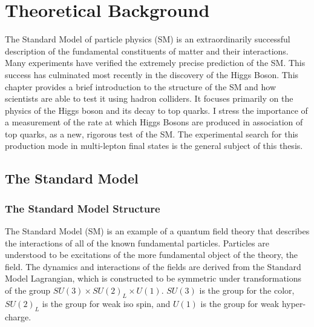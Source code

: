 \chapter[Theoretical Background][Theoretical Background]{Theoretical Background}

The Standard Model of particle physics (SM) is an extraordinarily successful
description of the fundamental constituents of matter and their interactions.
Many experiments have verified the extremely precise
prediction of the SM. This success has culminated most recently in the
discovery of the Higgs Boson.  This chapter provides a brief introduction to
the structure of the SM and how scientists are able to test it using hadron
colliders. It focuses primarily on the physics of the Higgs boson and its decay
to top quarks.  I stress the importance of a
measurement of the rate at which Higgs Bosons are produced in association of
top quarks, as a new, rigorous test of the SM. The experimental search
for this production mode in multi-lepton final states is the 
general subject of this thesis.


\section{The Standard Model}
\subsection{The Standard Model Structure}

The Standard Model (SM) \cite{np_22_579, prl_19_1264, 1964.Salam-Ward.gauge-theory,1973.Weinberg.SM-with-QCD} is an example of a quantum field theory that describes
the interactions of all of the known fundamental particles. Particles are understood to be excitations of the more fundamental
object of the theory, the field. The dynamics and interactions of the fields are
derived from the Standard Model Lagrangian, which is constructed to be
symmetric under transformations of the group $SU(3) \times SU(2)_L
  \times U(1)$. $SU(3)$ is the group for the color, $SU(2)_L$ is the group 
for weak iso spin, and $U(1)$ is the group for weak hyper-charge.

